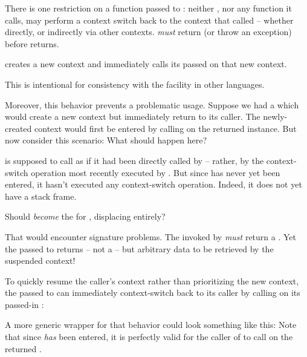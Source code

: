 There is one restriction on a function  passed to \resumewith:
neither , nor any function it calls, may perform a context switch
back to the context that called \resumewith -- whether directly, or indirectly
via other contexts.  \emph{must} return (or throw an exception)
before \resumewith returns.



\callcc creates a new context and immediately calls its passed \entryfn on
that new context.

This is intentional for consistency with the \cc facility in other
languages.\cite{schemecallcc}\citecomma\cite{rubycallcc}

Moreover, this behavior prevents a problematic usage. Suppose we had
a  which would create a new context but immediately
return to its caller. The newly-created context would first be entered by
calling \resume on the returned \cont instance.
But now consider this scenario:
What should happen here?

\resumewith is supposed to call  as if it had been
directly called by  -- rather, by the context-switch
operation most recently executed by . But
since  has never yet been entered, it hasn't executed
any context-switch operation. Indeed, it does not yet have a stack frame.

Should  \emph{become} the \entryfn
for , displacing  entirely?

That would encounter signature problems. The \entryfn invoked
by \callcc \emph{must} return a \cont. Yet the  passed to \resumewith
returns -- not a \cont -- but arbitrary data to be retrieved by the suspended
context!

To quickly resume the caller's context rather than prioritizing the new
context, the \entryfn passed to \callcc can immediately context-switch back
to its caller by calling \resume on its passed-in \cont:

A more generic wrapper for that behavior could look something like this:
Note that since  \emph{has} been entered, it
is perfectly valid for the caller of  to
call \resumewith on the returned \cont.

